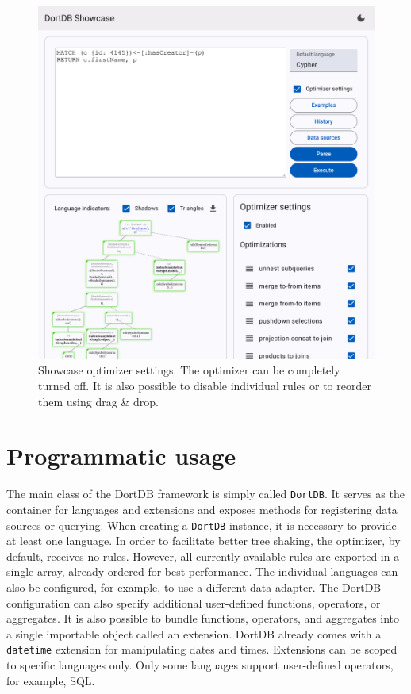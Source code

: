 \begin{figure}[!h]
    \centering
    \includegraphics[width=0.8\linewidth]{img/showcase_optimizer.png}
    \caption{Showcase optimizer settings. The optimizer can be completely turned off. It is also possible to disable individual rules or to reorder them using drag \& drop.}
\end{figure}

\clearpage
\section{Programmatic usage}

The main class of the DortDB framework is simply called \texttt{DortDB}. It serves as the container for languages and extensions and exposes methods for registering data sources or querying. When creating a \texttt{DortDB} instance, it is necessary to provide at least one language. In order to facilitate better tree shaking, the optimizer, by default, receives no rules. However, all currently available rules are exported in a single array, already ordered for best performance. The individual languages can also be configured, for example, to use a different data adapter. The DortDB configuration can also specify additional user-defined functions, operators, or aggregates. It is also possible to bundle functions, operators, and aggregates into a single importable object called an extension. DortDB already comes with a \texttt{datetime} extension for manipulating dates and times. Extensions can be scoped to specific languages only. Only some languages support user-defined operators, for example, SQL.

